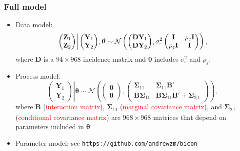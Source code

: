 \documentclass{beamer}
\newcommand{\Bmat} {\textbf{B}}
\newcommand{\Dmat} {\textbf{D}}
\newcommand{\Imat} {\textbf{I}}
\newcommand{\Yvec}{\mathbf{Y}}
\newcommand{\Zvec}{\mathbf{Z}}
\newcommand{\thetab}{\boldsymbol{\theta}}
\newcommand{\bzero}{\boldsymbol{0}}
\newcommand{\bSigma}{\bm{\Sigma}}
\begin{document}

\begin{frame}
\frametitle{Full model}

\begin{itemize}
\item Data model:
\begin{align*}
\left.\begin{pmatrix} \Zvec_1 \\ \Zvec_2 \end{pmatrix}
\right|
\begin{pmatrix} \Yvec_1 \\ \Yvec_2 \end{pmatrix} \hspace{-0.02in} ,\thetab
\sim
\mathcal{N}\left(
\begin{pmatrix} \Dmat\Yvec_1 \\ \Dmat\Yvec_2 \end{pmatrix}  \hspace{-0.02in}, \sigma^2_\varepsilon\begin{pmatrix} \Imat & \rho_\varepsilon\Imat \\ \rho_\varepsilon\Imat & \Imat \end{pmatrix}
\right),
\end{align*}
where $\Dmat$ is a $94\times 968$ incidence matrix and $\thetab$ includes $\sigma^2_\varepsilon$ and $\rho_\varepsilon$.
\item Process model:
\begin{equation*}
\left.\begin{pmatrix} \Yvec_1 \\ \Yvec_2 \end{pmatrix}\right| \thetab \sim \mathcal{N}
\left(
\begin{pmatrix} \bzero \\ \bzero \end{pmatrix},
\begin{pmatrix}
\bSigma_{11} & \bSigma_{11}\Bmat' \\
\Bmat \bSigma_{11} & \Bmat \bSigma_{11}\Bmat' + \bSigma_{2|1}
\end{pmatrix}
\right),
\end{equation*}
\noindent where $\mathbf{B}$ (\textcolor{red}{interaction matrix}), $\bSigma_{11}$ (\textcolor{red}{marginal covariance matrix}), and $\bSigma_{2|1}$ (\textcolor{red}{conditional covariance matrix}) are $968\times 968$ matrices that depend on parameters included in $\thetab$.
\item Parameter model: see \texttt{https://github.com/andrewzm/bicon}
\end{itemize}
\end{frame}
\end{document}
